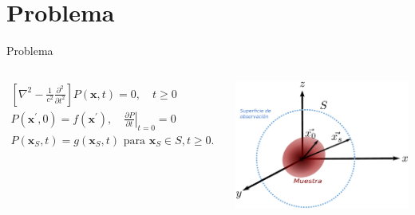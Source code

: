 \documentclass[aspectratio=169,xcolor=dvipsnames]{beamer}
\begin{document}
\section{Problema}
\begin{frame}{Problema}
    \begin{columns}[c] %

        \begin{equation}
            \begin{gathered}
                \left[\nabla^2-\frac{1}{c^2} \frac{\partial^2}{\partial t^2}\right] P(\mathbf{x}, t)=0, \quad t \geq 0 \\ 
                P\left(\mathbf{x}^{\prime}, 0\right)=f\left(\mathbf{x}^{\prime}\right),\left.\quad \frac{\partial P}{\partial t}\right|_{t=0}=0 \\ 
                P\left(\mathbf{x}_S, t\right)=g\left(\mathbf{x}_S, t\right) \text { para } \mathbf{x}_S \in S, t \geq 0 .
            \end{gathered}
        \end{equation}

        \centering
        \includegraphics[width=\textwidth]{img/super.pdf} %

    \end{columns}
\end{frame}
\end{document}
